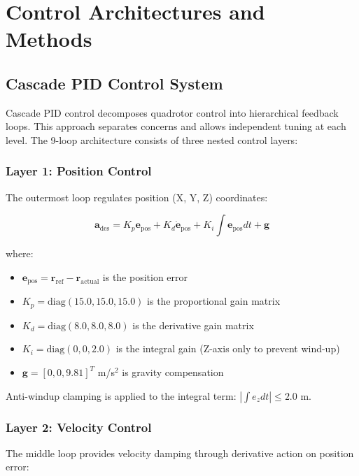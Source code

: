 \documentclass[journal]{IEEEtran}
\begin{document}
\section{Control Architectures and Methods}\label{sec:methods}

\subsection{Cascade PID Control System}

Cascade PID control decomposes quadrotor control into hierarchical feedback loops. This approach separates concerns and allows independent tuning at each level. The 9-loop architecture consists of three nested control layers:

\subsubsection{Layer 1: Position Control}

The outermost loop regulates position (X, Y, Z) coordinates:

\begin{equation}
\mathbf{a}_{\text{des}} = K_p \mathbf{e}_{\text{pos}} + K_d \dot{\mathbf{e}}_{\text{pos}} + K_i \int \mathbf{e}_{\text{pos}} dt + \mathbf{g}
\label{eq:pos_control}
\end{equation}

where:
\begin{itemize}
    \item $\mathbf{e}_{\text{pos}} = \mathbf{r}_{\text{ref}} - \mathbf{r}_{\text{actual}}$ is the position error
    \item $K_p = \text{diag}(15.0, 15.0, 15.0)$ is the proportional gain matrix
    \item $K_d = \text{diag}(8.0, 8.0, 8.0)$ is the derivative gain matrix
    \item $K_i = \text{diag}(0, 0, 2.0)$ is the integral gain (Z-axis only to prevent wind-up)
    \item $\mathbf{g} = [0, 0, 9.81]^T$ m/s$^2$ is gravity compensation
\end{itemize}

Anti-windup clamping is applied to the integral term: $|\int e_z dt| \leq 2.0$ m.

\subsubsection{Layer 2: Velocity Control}

The middle loop provides velocity damping through derivative action on position error:
\end{document}
